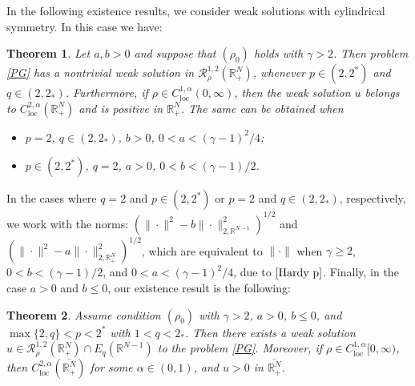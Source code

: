 \documentclass[12pt,reqno]{amsart}
\newtheorem{theorem}{Theorem}[section]
\begin{document}
In the following existence results, we consider weak solutions with cylindrical symmetry. In this case we have:

\begin{theorem}\label{Problem2-Existence} Let $a,b>0$ and suppose that $(\rho_0)$ holds with $\gamma>2$. Then problem \eqref{PG} has a nontrivial weak solution in $\mathcal{R}^{1,2}_\rho(\mathds{R}^N_+)$, whenever $p\in (2,2^\ast)$ and $q \in (2,2_\ast)$. Furthermore, if $\rho \in C^{1,\alpha}_{\mathrm{loc}}(0,\infty)$, then the weak solution  $u$ belongs to $C^{2,\alpha}_{\mathrm{loc}}(\mathds{R}^N_+)$ and is positive in $\mathds{R}^N_+$. The same can be obtained when
\begin{itemize}
    \item [$(i)$]  $p=2$, $q\in(2,2_\ast)$, $b>0$, $0<a<(\gamma-1)^2/4$;
    \item[$(ii)$] $ p\in(2,2^\ast)$, $q=2$, $a>0$, $0<b<(\gamma-1)/2$.
\end{itemize}
\end{theorem}

In the cases where $q=2$ and $p\in(2,2^\ast)$ or $p=2$ and $q\in(2,2_\ast)$, respectively, we work with the norms: $(\|\cdot\|^2-b\|\cdot\|_{2,\mathds{R}^{N-1}}^2)^{1/2}$ and $(\|\cdot\|^2-a\|\cdot\|_{2,\mathds{R}^N_+}^2)^{1/2}$, which are equivalent to $\|\cdot\|$ when $\gamma\geq 2$, $0<b<(\gamma-1)/2$, and $0<a<(\gamma-1)^2/4$, due to $\eqref{Hardy p}$. Finally, in the case $a>0$ and $b\leq 0$, our existence result is the following:

\begin{theorem}\label{Existence 3}
Assume condition $(\rho_0)$ with $\gamma > 2$, $a > 0$, $b \leq 0$, and $\max\{2,q\} < p < 2^\ast$ with $1<q < 2_\ast$. Then there exists a weak solution $u \in \mathcal{R}^{1,2}_\rho(\mathds{R}^N_+)\cap E_q(\mathds{R}^{N-1})$ to the problem \eqref{PG}. Moreover, if $\rho \in C^{1,\alpha}_{\mathrm{loc}}[0,\infty)$, then $C^{2,\alpha}_{\mathrm{loc}}(\overline{\mathds{R}^N_+})$ for some $\alpha \in (0,1)$, and $u > 0$ in $\overline{\mathds{R}^N_+}$.
\end{theorem}
\end{document}
